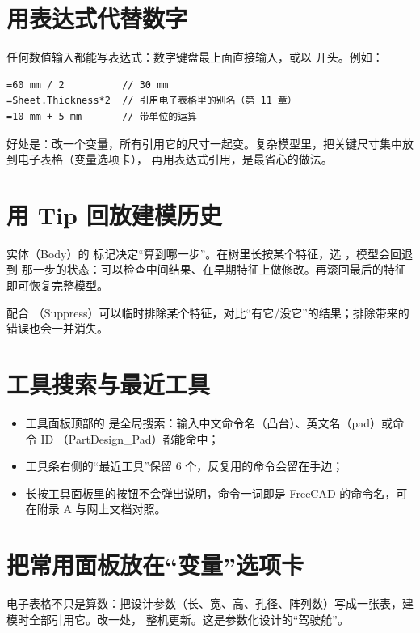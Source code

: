 \section{用表达式代替数字}

任何数值输入都能写表达式：数字键盘最上面直接输入，或以 \file{=} 开头。例如：

\begin{lstlisting}
=60 mm / 2          // 30 mm
=Sheet.Thickness*2  // 引用电子表格里的别名（第 11 章）
=10 mm + 5 mm       // 带单位的运算
\end{lstlisting}

好处是：改一个变量，所有引用它的尺寸一起变。复杂模型里，把关键尺寸集中放到电子表格（变量选项卡），
再用表达式引用，是最省心的做法。

\section{用 Tip 回放建模历史}

实体（Body）的  标记决定“算到哪一步”。在树里长按某个特征，选 ，模型会回退到
那一步的状态：可以检查中间结果、在早期特征上做修改。再滚回最后的特征即可恢复完整模型。

配合 （Suppress）可以临时排除某个特征，对比“有它/没它”的结果；排除带来的错误也会一并消失。

\section{工具搜索与最近工具}

\begin{itemize}
  \item 工具面板顶部的  是全局搜索：输入中文命令名（凸台）、英文名（pad）或命令 ID
        （PartDesign\_Pad）都能命中；
  \item 工具条右侧的“最近工具”保留 6 个，反复用的命令会留在手边；
  \item 长按工具面板里的按钮不会弹出说明，命令一词即是 FreeCAD 的命令名，可在附录 A 与网上文档对照。
\end{itemize}

\section{把常用面板放在“变量”选项卡}

电子表格不只是算数：把设计参数（长、宽、高、孔径、阵列数）写成一张表，建模时全部引用它。改一处，
整机更新。这是参数化设计的“驾驶舱”。

